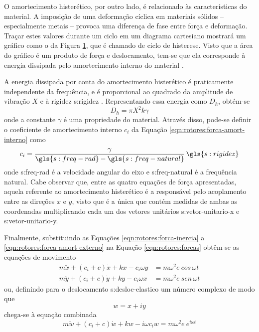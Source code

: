 \documentclass[12pt,openright,oneside,a4paper,
	chapter=TITLE,section=TITLE,
	english,brazil]{abntex2}
\begin{document}
	O amortecimento histerético, por outro lado, é relacionado às características do material. A imposição de uma deformação cíclica em materiais sólidos -- especialmente metais -- provoca uma diferença de fase entre força e deformação. Traçar estes valores durante um ciclo em um diagrama cartesiano mostrará um gráfico como o da Figura \ref{fig:histerese}, que é chamado de ciclo de histerese. Visto que a área do gráfico é um produto de força e deslocamento, tem-se que ela corresponde à energia dissipada pelo amortecimento interno do material \cite{dimarogonas:1995}. 
	\begin{figure}[b]
		\label{fig:histerese}
	\end{figure}

	A energia dissipada por conta do amortecimento histerético é praticamente independente da frequência, e é proporcional ao quadrado da amplitude de vibração $ X $ e à rigidez \gls{s:rigidez} \cite{dimarogonas:1995}. Representando essa energia como $ D_h $, obtém-se
	\begin{equation}
		D_h = \pi X^2k\gamma
	\end{equation}
	onde a constante $ \gamma $ é uma propriedade do material. Através disso, pode-se definir o coeficiente de amortecimento interno $ c_i $ da Equação \ref{eqn:rotores:forca-amort-interno} como \cite{dimarogonas:1995}
	\begin{equation}
		c_i = \frac{\gamma}{\gls{s:freq-rad} - \gls{s:freq-natural}}\,\gls{s:rigidez}
	\end{equation}
	onde \gls{s:freq-rad} é a velocidade angular do eixo e \gls{s:freq-natural} é a frequência natural. Cabe observar que, entre as quatro equações de força apresentadas, aquela referente ao amortecimento histerético é a responsável pelo acoplamento entre as direções $ x $ e $ y $, visto que é a única que contém medidas de ambas as coordenadas multiplicando cada um dos vetores unitários \gls{s:vetor-unitario-x} e \gls{s:vetor-unitario-y}.
	
	Finalmente, substituindo as Equações \ref{eqn:rotores:forca-inercia} a \ref{eqn:rotores:forca-amort-externo} na Equação \ref{eqn:rotores:forcas} obtêm-se as equações de movimento \cite{rao:2008}
	\begin{align}
		m\ddot{x} + (c_i + c)\dot{x} + kx - c_i\omega y &= m\omega^2\mathit{e}\ cos\,\omega t \\
		m\ddot{y} + (c_i + c)\dot{y} + ky - c_i\omega x &= m\omega^2\mathit{e}\ sen\,\omega t
	\end{align}
	ou, definindo para o deslocamento \gls{s:desloc-elastico} um número complexo de modo que \[ w = x + iy \] chega-se à equação combinada
	\begin{equation}\label{eqn:rotores:resposta-rodopio}
		m\ddot{w} + (c_i + c)\dot{w} + kw - i\omega c_i w = m\omega^2 \mathit{e}\ e^{i\omega t}
	\end{equation}
	
\end{document}
